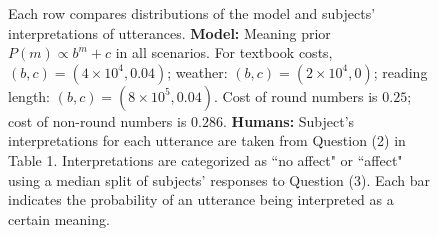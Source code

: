 \documentclass{article} %
\begin{document}
\begin{figure}[H]
\begin{subfigure}[b]{0.51\textwidth}
        \end{subfigure} 
        \caption{Each row compares distributions of the model and subjects' interpretations of utterances. \textbf{Model:} Meaning prior $P(m) \propto b^m + c$  in all scenarios. For textbook costs, $(b, c) = (4 \times 10^4, 0.04)$; weather: $(b, c) = (2 \times 10^4, 0)$; reading length: $(b, c) = (8 \times 10^5, 0.04)$. Cost of round numbers is $0.25$; cost of non-round numbers is $0.286$. \textbf{Humans:} Subject's interpretations for each utterance are taken from Question (2) in Table 1. Interpretations are categorized as ``no affect" or ``affect" using a median split of subjects' responses to Question (3). Each bar indicates the probability of an utterance being interpreted as a certain meaning.}
        \label{fig:results}
  \end{figure}



\clearpage

\small{

}
\end{document}
